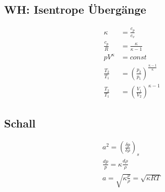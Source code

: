 \documentclass[12pt]{article}
\begin{document}
\subsection{WH: Isentrope Übergänge}
\begin{tcolorbox}[colback=backblue,colframe=borderblue,title=Isentropie]
\begin{align*}
\kappa&=\frac{c_p}{c_v}\\
\frac{c_p}{R}&=\frac{\kappa}{\kappa-1}\\
pV^\kappa&=const\\
\frac{T_2}{T_1}&=\left(\frac{p_2}{p_1}\right)^{\frac{\kappa-1}{\kappa}}\\
\frac{T_2}{T_1}&=\left(\frac{V_1}{V_2}\right)^{\kappa-1}
\end{align*}
\end{tcolorbox}
\subsection{Schall}
\begin{align*}
a^2=\left(\frac{\delta p}{\delta \rho}\right)_s\\
\frac{dp}{p}=\kappa \frac{d\rho}{\rho}\\
a=\sqrt{\kappa\frac{p}{\rho}}=\sqrt{\kappa R T}
\end{align*}
\end{document}

